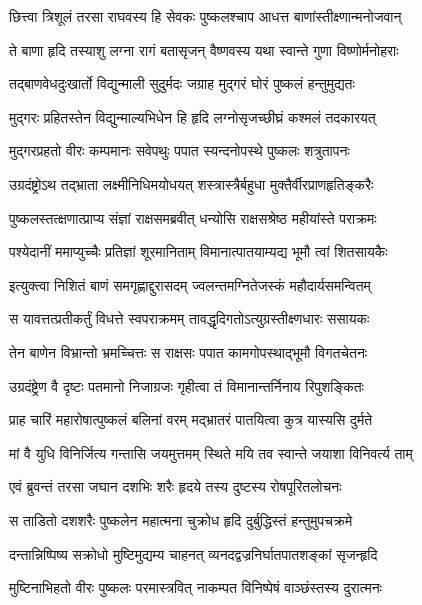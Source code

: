 \twolineshloka
{छित्त्वा त्रिशूलं तरसा राघवस्य हि सेवकः}
{पुष्कलश्चाप आधत्त बाणांस्तीक्ष्णान्मनोजवान्}%

\twolineshloka
{ते बाणा हृदि तस्याशु लग्ना रागं बतासृजन्}
{वैष्णवस्य यथा स्वान्ते गुणा विष्णोर्मनोहराः}%

\twolineshloka
{तद्बाणवेधदुःखार्तो विद्युन्माली सुदुर्मदः}
{जग्राह मुद्गरं घोरं पुष्कलं हन्तुमुद्यतः}%

\twolineshloka
{मुद्गरः प्रहितस्तेन विद्युन्माल्यभिधेन हि}
{हृदि लग्नोसृजच्छीघ्रं कश्मलं तदकारयत्}%

\twolineshloka
{मुद्गरप्रहतो वीरः कम्पमानः सवेपथुः}
{पपात स्यन्दनोपस्थे पुष्कलः शत्रुतापनः}%

\twolineshloka
{उग्रदंष्ट्रोऽथ तद्भ्राता लक्ष्मीनिधिमयोधयत्}
{शस्त्रास्त्रैर्बहुधा मुक्तैर्वीरप्राणहृतिङ्करैः}%

\twolineshloka
{पुष्कलस्तत्क्षणात्प्राप्य संज्ञां राक्षसमब्रवीत्}
{धन्योसि राक्षसश्रेष्ठ महीयांस्ते पराक्रमः}%

\twolineshloka
{पश्येदानीं ममाप्युच्चैः प्रतिज्ञां शूरमानिताम्}
{विमानात्पातयाम्यद्य भूमौ त्वां शितसायकैः}%

\twolineshloka
{इत्युक्त्वा निशितं बाणं समगृह्णाद्दुरासदम्}
{ज्वलन्तमग्नितेजस्कं महौदार्यसमन्वितम्}%

\twolineshloka
{स यावत्तत्प्रतीकर्तुं विधत्ते स्वपराक्रमम्}
{तावद्धृदिगतोऽत्युग्रस्तीक्ष्णधारः ससायकः}%

\twolineshloka
{तेन बाणेन विभ्रान्तो भ्रमच्चित्तः स राक्षसः}
{पपात कामगोपस्थाद्भूमौ विगतचेतनः}%

\twolineshloka
{उग्रदंष्ट्रेण वै दृष्टः पतमानो निजाग्रजः}
{गृहीत्वा तं विमानान्तर्निनाय रिपुशङ्कितः}%

\twolineshloka
{प्राह चारिं महारोषात्पुष्कलं बलिनां वरम्}
{मद्भ्रातरं पातयित्वा कुत्र यास्यसि दुर्मते}%

\twolineshloka
{मां वै युधि विनिर्जित्य गन्तासि जयमुत्तमम्}
{स्थिते मयि तव स्वान्ते जयाशा विनिवर्त्य ताम्}%

\twolineshloka
{एवं ब्रुवन्तं तरसा जघान दशभिः शरैः}
{हृदये तस्य दुष्टस्य रोषपूरितलोचनः}%

\twolineshloka
{स ताडितो दशशरैः पुष्कलेन महात्मना}
{चुक्रोध हृदि दुर्बुद्धिस्तं हन्तुमुपचक्रमे}%

\twolineshloka
{दन्तान्निष्पिष्य सक्रोधो मुष्टिमुद्यम्य चाहनत्}
{व्यनदद्वज्रनिर्घातपातशङ्कां सृजन्हृदि}%

\twolineshloka
{मुष्टिनाभिहतो वीरः पुष्कलः परमास्त्रवित्}
{नाकम्पत विनिष्पेषं वाञ्छंस्तस्य दुरात्मनः}%

